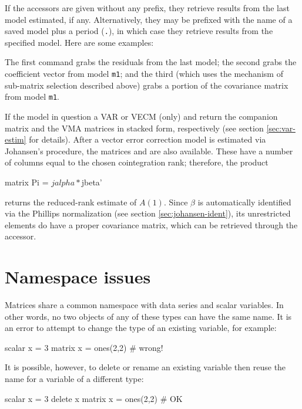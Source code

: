 If the accessors are given without any prefix, they retrieve results
from the last model estimated, if any.  Alternatively, they may be
prefixed with the name of a saved model plus a period (\texttt{.}), in
which case they retrieve results from the specified model.  Here are
some examples:
%
The first command grabs the residuals from the last model; the second
grabs the coefficient vector from model \texttt{m1}; and the third
(which uses the mechanism of sub-matrix selection described above)
grabs a portion of the covariance matrix from model \texttt{m1}.

If the model in question a VAR or VECM (only)  and
 return the companion matrix and the VMA matrices in
stacked form, respectively (see section \ref{sec:var-estim} for
details).  After a vector error correction model is estimated via
Johansen's procedure, the matrices  and 
are also available. These have a number of columns equal to the chosen
cointegration rank; therefore, the product
\begin{code}
matrix Pi = $jalpha * $jbeta'
\end{code}
returns the reduced-rank estimate of $A(1)$. Since $\beta$ is
automatically identified via the Phillips normalization (see section
\ref{sec:johansen-ident}), its unrestricted elements do have a proper
covariance matrix, which can be retrieved through the
 accessor.

\section{Namespace issues}
\label{matrix-namespace}

Matrices share a common namespace with data series and scalar
variables.  In other words, no two objects of any of these types can
have the same name.  It is an error to attempt to change the type of
an existing variable, for example:
%
\begin{code}
scalar x = 3
matrix x = ones(2,2) # wrong!
\end{code}
%
It is possible, however, to delete or rename an existing variable then
reuse the name for a variable of a different type:
\begin{code}
scalar x = 3
delete x
matrix x = ones(2,2) # OK
\end{code}


